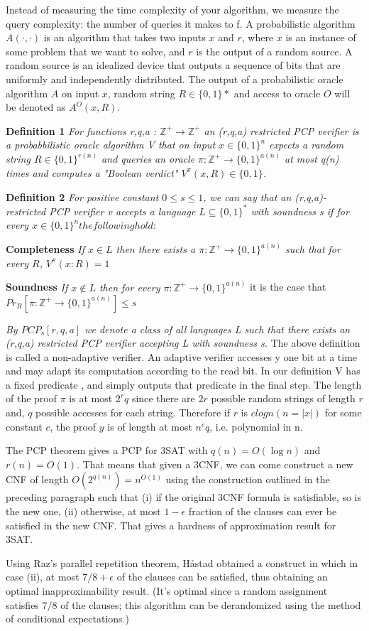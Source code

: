 Instead of measuring the time complexity of your algorithm, we measure the query complexity: the number of queries it makes to f. A probabilistic algorithm $A(·, ·)$ is an algorithm that takes two inputs $x$ and $r$, where $x$ is an instance of some problem that we want to solve, and $r$ is the output of a random source. A random source is an idealized device that outputs a sequence of bits that are uniformly and independently distributed. The output of a probabilistic oracle algorithm $A$ on input $x$, random string $R \in \{0,1\}*$ and access to oracle $O$ will be denoted as $A^O(x,R)$.

\textbf{Definition 1} \textit{For functions r,q,a : $\mathbb{Z}^+ \rightarrow \mathbb{Z}^+$ an (r,q,a) restricted PCP verifier is a probabbilistic oracle algorithm V that on input $x \in \{0,1\}^n$ expects a random string $R \in \{0,1\}^{r(n)}$ and queries an oracle $\pi : \mathbb{Z}^+ \rightarrow \{0,1\}^{a(n)}$ at most q(n) times and computes a "Boolean verdict" $V^{\pi}(x,R) \in \{0,1\}$.}

\textbf{Definition 2} \textit{For positive constant $0 \leq s \leq 1$, we can say that an (r,q,a)-restricted PCP verifier v accepts a language $L \subseteq \{0,1\}^*$ with soundness s if for every $x \in \{0,1\}^n the following hold:$}

\textbf{Completeness} \textit{If $x \in L$ then there exists a $\pi : \mathbb{Z}^+ \rightarrow \{0,1\}^{a(n)}$ such that for every $R$, $V^{\pi}(x:R) = 1$}

\textbf{Soundness} \textit{If $x \notin L$ then for every $\pi : \mathbb{Z}^+ \rightarrow \{0,1\}^{a(n)}$} it is the case that $Pr_R[\pi : \mathbb{Z}^+ \rightarrow \{0,1\}^{a(n)}] \leq s$

\textit{By $PCP_s[r,q,a]$ we denote a class of all languages L such that there exists an (r,q,a) restricted PCP verifier accepting L with soundness s.} The above definition is called a non-adaptive verifier. An adaptive verifier accesses y one bit at a time and may adapt its computation according to the read bit. In our definition V has a fixed predicate , and simply outputs that predicate in the final step. The length of the proof $\pi$ is at most $2^rq$ since there are $2r$ possible random strings of length $r$ and, $q$ possible accesses for each string. Therefore if $r$ is $c log n(n = |x|)$ for some constant $c$, the proof $y$ is of length at most $n^cq$, i.e. polynomial in n.

The PCP theorem gives a PCP for 3SAT with $q(n) = O(\log n)$ and $r(n) = O(1)$. That means that given a 3CNF, we can come construct a new CNF of length $O(2^{q(n)}) = n^{O(1)}$ using the construction outlined in the preceding paragraph such that (i) if the original 3CNF formula is satisfiable, so is the new one, (ii) otherwise, at most $1-\epsilon$ fraction of the clauses can ever be satisfied in the new CNF. That gives a hardness of approximation result for 3SAT. 

Using Raz's parallel repetition theorem, Håstad obtained a construct in which in case (ii), at most $7/8+\epsilon$ of the clauses can be satisfied, thus obtaining an optimal inapproximability result. (It's optimal since a random assignment satisfies $7/8$ of the clauses; this algorithm can be derandomized using the method of conditional expectations.)
